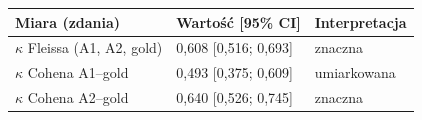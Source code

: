 \begin{tabular}{lll}
\toprule
Miara (zdania) & Wartość [95\% CI] & Interpretacja \\
\midrule
$\kappa$ Fleissa (A1, A2, gold) & 0{,}608 [0{,}516; 0{,}693] & znaczna \\
$\kappa$ Cohena A1--gold & 0{,}493 [0{,}375; 0{,}609] & umiarkowana \\
$\kappa$ Cohena A2--gold & 0{,}640 [0{,}526; 0{,}745] & znaczna \\
\bottomrule
\end{tabular}

